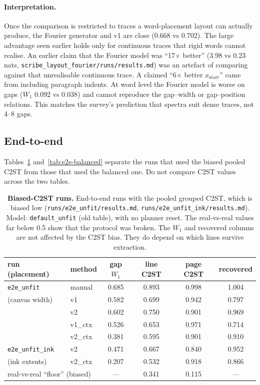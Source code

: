 \documentclass[11pt,a4paper]{article}
\newcommand{\src}[1]{{\footnotesize\texttt{#1}}}
\begin{document}
\paragraph{Interpretation.} Once the comparison is restricted to traces a
word-placement layout can actually produce, the Fourier generator and v1 are
close (0.668 vs 0.702). The large advantage seen earlier holds only for
continuous traces that rigid words cannot realise. An earlier claim that the
Fourier model was ``17$\times$ better'' (3.98 vs 0.23 nats,
\src{scribe\_layout\_fourier/runs/results.md}) was an artefact of comparing
against that unrealisable continuous trace. A claimed ``6$\times$ better
$x_\text{start}$'' came from including paragraph indents. At word level the
Fourier model is worse on gaps ($W_1$ 0.092 vs 0.038) and cannot reproduce the
gap--width or gap--position relations. This matches the survey's prediction
that spectra suit dense traces, not 4--8 gaps.

\subsection{End-to-end}
\label{sec:e2e}
Tables~\ref{tab:e2e-biased} and~\ref{tab:e2e-balanced} separate the runs that used the biased pooled C2ST from those that used the balanced one. Do not compare C2ST values across the two tables.
\begin{table}[H]\centering\small
\begin{tabular}{llcccc}
\toprule
run (placement) & method & gap $W_1$ & line C2ST & page C2ST & recovered\\
\midrule
\texttt{e2e\_unfit} & manual & 0.685 & 0.893 & 0.998 & 1.004\\
(canvas width) & v1     & 0.582 & 0.699 & 0.942 & 0.797\\
 & v2     & 0.602 & 0.750 & 0.901 & 0.969\\
 & v1\_ctx & 0.526 & 0.653 & 0.971 & 0.714\\
 & v2\_ctx & 0.381 & 0.595 & 0.901 & 0.910\\
\midrule
\texttt{e2e\_unfit\_ink} & v2     & 0.471 & 0.667 & 0.840 & 0.952\\
(ink extents) & v2\_ctx & 0.207 & 0.532 & 0.918 & 0.866\\
\midrule
\multicolumn{2}{l}{real-vs-real ``floor'' (biased)} & --- & 0.341 & 0.115 & ---\\
\bottomrule
\end{tabular}
\caption{\textbf{Biased-C2ST runs.} End-to-end runs with the pooled grouped C2ST, which is biased low
(\src{runs/e2e\_unfit/results.md}, \src{runs/e2e\_unfit\_ink/results.md}).
Model: \texttt{default\_unfit} (old table), with no planner reset. The
real-vs-real values far below 0.5 show that the protocol was broken. The
$W_1$ and recovered columns are not affected by the C2ST bias. They do depend
on which lines survive extraction.}
\label{tab:e2e-biased}
\end{table}
\end{document}

